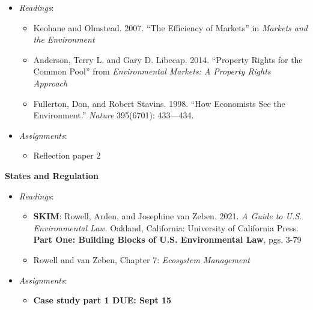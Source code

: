 \begin{itemize}

\item
  \emph{Readings}:

  \begin{itemize}
  
  \item
    Keohane and Olmstead. 2007. ``The Efficiency of Markets'' in
    \emph{Markets and the Environment}
  \item
    Anderson, Terry L. and Gary D. Libecap. 2014. ``Property Rights for
    the Common Pool'' from \emph{Environmental Markets: A Property
    Rights Approach}
  \item
    Fullerton, Don, and Robert Stavins. 1998. ``How Economists See the
    Environment.'' \emph{Nature} 395(6701): 433---434.
  \end{itemize}
\item
  \emph{Assignments}:

  \begin{itemize}
  
  \item
    Reflection paper 2
  \end{itemize}
\end{itemize}

\week \textbf{States and Regulation}

\begin{itemize}

\item
  \emph{Readings}:

  \begin{itemize}
  
  \item
    \textbf{SKIM}: Rowell, Arden, and Josephine van Zeben. 2021. \emph{A
    Guide to U.S. Environmental Law}. Oakland, California: University of
    California Press. \textbf{Part One: Building Blocks of U.S.
    Environmental Law}, pgs. 3-79
  \item
    Rowell and van Zeben, Chapter 7: \emph{Ecosystem Management}
  \end{itemize}
\item
  \emph{Assignments}:

  \begin{itemize}
  
  \item
    \textbf{Case study part 1 DUE: Sept 15}
  \end{itemize}
\end{itemize}

